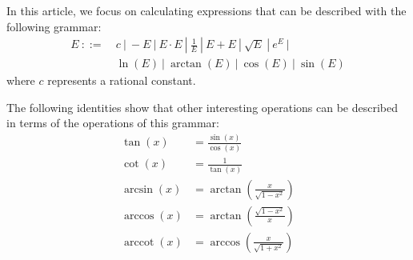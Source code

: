 \documentclass{article}
\numberwithin{mytheorem}{section}
\DeclareMathOperator{\arccot}{arccot}
\begin{document}
In this article, we focus on calculating expressions that can be described with the following grammar:
\begin{equation}
\begin{aligned}
E~::=&
	~c~|
 	~-E~|
 	~E\cdot E~|
 	~\frac{1}{E}~|
 	~E+E~|
 	~\sqrt{E}~|
 	~e^E~|\\
 &	~\ln(E)~|
 	~\arctan(E)~|
 	~\cos(E)~|
 	~\sin(E)\label{eqn:grammar}
\end{aligned}
\end{equation}
where $c$ represents a rational constant. 

The following identities show that other interesting operations can be described in terms of the operations of this grammar:
\begin{align*}
\tan(x)&=\frac{\sin(x)}{\cos(x)}\\
\cot(x)&=\frac{1}{\tan(x)}\\
\arcsin(x)&=\arctan(\frac{x}{\sqrt{1-x^2}})\\
\arccos(x)&=\arctan(\frac{\sqrt{1-x^2}}{x})\\
\arccot(x)&=\arccos(\frac{x}{\sqrt{1+x^2}})
\end{align*}


\end{document}
